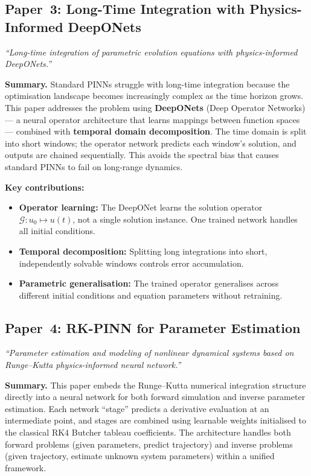 \documentclass[12pt,a4paper]{article}
\begin{document}
\subsection{Paper~3: Long-Time Integration with Physics-Informed DeepONets}
\label{sec:paper3}

\textit{``Long-time integration of parametric evolution equations with physics-informed DeepONets.''}

\medskip
\noindent\textbf{Summary.} Standard PINNs struggle with long-time integration because the optimisation landscape becomes increasingly complex as the time horizon grows. This paper addresses the problem using \textbf{DeepONets} (Deep Operator Networks) --- a neural operator architecture that learns mappings between function spaces --- combined with \textbf{temporal domain decomposition}. The time domain is split into short windows; the operator network predicts each window's solution, and outputs are chained sequentially. This avoids the spectral bias that causes standard PINNs to fail on long-range dynamics.

\medskip
\noindent\textbf{Key contributions:}
\begin{itemize}
\item \textbf{Operator learning:} The DeepONet learns the solution operator $\mathcal{G}: u_0 \mapsto u(t)$, not a single solution instance. One trained network handles all initial conditions.
\item \textbf{Temporal decomposition:} Splitting long integrations into short, independently solvable windows controls error accumulation.
\item \textbf{Parametric generalisation:} The trained operator generalises across different initial conditions and equation parameters without retraining.
\end{itemize}

\subsection{Paper~4: RK-PINN for Parameter Estimation}
\label{sec:paper4}

\textit{``Parameter estimation and modeling of nonlinear dynamical systems based on Runge--Kutta physics-informed neural network.''}

\medskip
\noindent\textbf{Summary.} This paper embeds the Runge--Kutta numerical integration structure directly into a neural network for both forward simulation and inverse parameter estimation. Each network ``stage'' predicts a derivative evaluation at an intermediate point, and stages are combined using learnable weights initialised to the classical RK4 Butcher tableau coefficients. The architecture handles both forward problems (given parameters, predict trajectory) and inverse problems (given trajectory, estimate unknown system parameters) within a unified framework.
\end{document}
